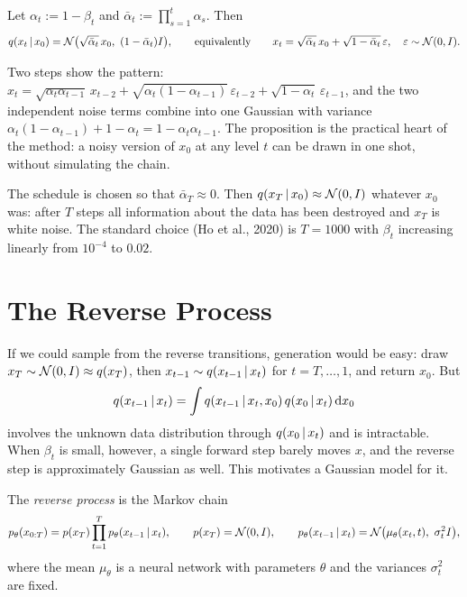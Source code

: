 \begin{proposition}\label{prop:diffusion-marginal}
Let $\alpha_t:=1-\beta_t$ and $\bar\alpha_t:=\prod_{s=1}^t\alpha_s$. Then
\[
q(x_t\given x_0)=\cN\big(\sqrt{\bar\alpha_t}\,x_0,\ (1-\bar\alpha_t)I\big),\qquad\text{equivalently}\qquad x_t=\sqrt{\bar\alpha_t}\,x_0+\sqrt{1-\bar\alpha_t}\,\varepsilon,\quad\varepsilon\sim\cN(0,I).
\]
\end{proposition}

Two steps show the pattern: $x_t=\sqrt{\alpha_t\alpha_{t-1}}\,x_{t-2}+\sqrt{\alpha_t(1-\alpha_{t-1})}\,\varepsilon_{t-2}+\sqrt{1-\alpha_t}\,\varepsilon_{t-1}$, and the two independent noise terms combine into one Gaussian with variance $\alpha_t(1-\alpha_{t-1})+1-\alpha_t=1-\alpha_t\alpha_{t-1}$. The proposition is the practical heart of the method: a noisy version of $x_0$ at any level $t$ can be drawn in one shot, without simulating the chain.

The schedule is chosen so that $\bar\alpha_T\approx0$. Then $q(x_T\,|\, x_0)\approx\mathcal{N}(0,I)$ whatever $x_0$ was: after $T$ steps all information about the data has been destroyed and $x_T$ is white noise. The standard choice (Ho et al., 2020) is $T=1000$ with $\beta_t$ increasing linearly from $10^{-4}$ to $0.02$.

\section{The Reverse Process}\label{sec:reverse-process}

If we could sample from the reverse transitions, generation would be easy: draw $x_T\sim\mathcal{N}(0,I)\approx q(x_T)$, then $x_{t-1}\sim q(x_{t-1}\,|\, x_t)$ for $t=T,\dots,1$, and return $x_0$. But
\[
q(x_{t-1}\,|\, x_t)=\int q(x_{t-1}\,|\, x_t,x_0)\,q(x_0\,|\, x_t)\,\mathrm{d} x_0
\]
involves the unknown data distribution through $q(x_0\,|\, x_t)$ and is intractable. When $\beta_t$ is small, however, a single forward step barely moves $x$, and the reverse step is approximately Gaussian as well. This motivates a Gaussian model for it.

\begin{definition}
The \emph{reverse process} is the Markov chain
\[
p_\theta(x_{0:T})=p(x_T)\prod_{t=1}^Tp_\theta(x_{t-1}\,|\, x_t),\qquad p(x_T)=\mathcal{N}(0,I),\qquad p_\theta(x_{t-1}\,|\, x_t)=\mathcal{N}\big(\mu_\theta(x_t,t),\ \sigma_t^2I\big),
\]
where the mean $\mu_\theta$ is a neural network with parameters $\theta$ and the variances $\sigma_t^2$ are fixed.
\end{definition}

